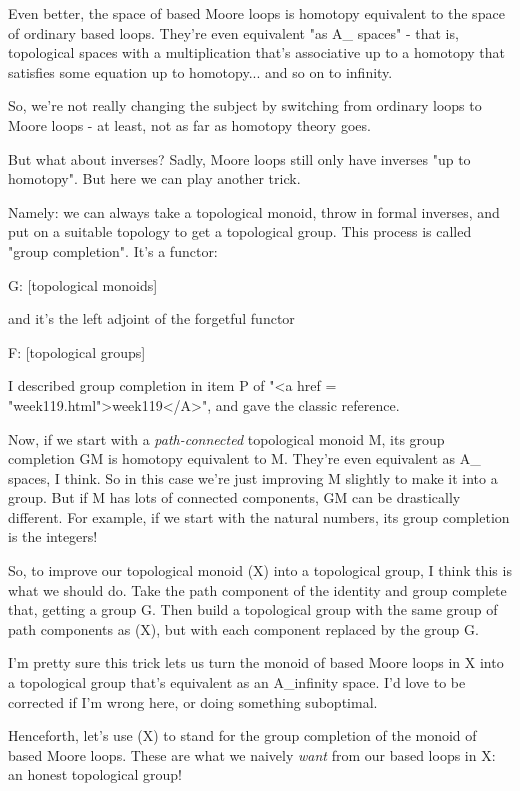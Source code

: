 Even better, the space of based Moore loops is homotopy equivalent to
the space of ordinary based loops.  They're even equivalent "as
A_{\infty } spaces" - that is, topological spaces with a
multiplication that's associative up to a homotopy that satisfies some
equation up to homotopy... and so on to infinity.

So, we're not really changing the subject by switching from ordinary
loops to Moore loops - at least, not as far as homotopy theory goes.

But what about inverses?  Sadly, Moore loops still only have inverses
"up to homotopy".  But here we can play another trick.  

Namely: we can always take a topological monoid, throw in formal
inverses, and put on a suitable topology to get a topological group.
This process is called "group completion".  It's a functor:

G: [topological monoids] 

and it's the left adjoint of the forgetful functor

F: [topological groups] 

I described group completion in item P of "<a href =
"week119.html">week119</A>", and gave the classic reference.

Now, if we start with a \emph{path-connected} topological monoid M, its
group completion GM is homotopy equivalent to M.  They're even
equivalent as A_{\infty } spaces, I think.  So in this case we're just
improving M slightly to make it into a group.  But if M has lots of
connected components, GM can be drastically different.  For example,
if we start with the natural numbers, its group completion is the
integers!  

So, to improve our topological monoid \Omega (X) into a topological
group, I think this is what we should do.  Take the path component of
the identity and group complete that, getting a group G.  Then build a
topological group with the same group of path components as \Omega (X),
but with each component replaced by the group G.  

I'm pretty sure this trick lets us turn the monoid of based Moore
loops in X into a topological group that's equivalent as an
A_{i}nfinity space.  I'd love to be corrected if I'm wrong
here, or doing something suboptimal.

Henceforth, let's use \Omega (X) to stand for the group completion of
the monoid of based Moore loops.  These are what we naively \emph{want}
from our based loops in X: an honest topological group!

